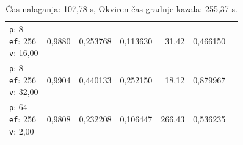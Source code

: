 \begin{table}[htbp]
\begin{tabularx}{\textwidth}{Xrrrrrr}
    \makecell{\texttt{p}: 8\\\texttt{ef}: 256\\\texttt{v}: 16,00} & 0,9880 & 0,253768 & 0,113630 & 31,42 & 0,466150 \\
    \makecell{\texttt{p}: 8\\\texttt{ef}: 256\\\texttt{v}: 32,00} & 0,9904 & 0,440133 & 0,252150 & 18,12 & 0,879967 \\
    \makecell{\texttt{p}: 64\\\texttt{ef}: 256\\\texttt{v}: 2,00} & 0,9808 & 0,232208 & 0,106447 & 266,43 & 0,536235 \\
    \bottomrule
  \end{tabularx}
\caption* {Čas nalaganja: 107,78 s, Okviren čas gradnje kazala: 255,37 s.}\end{table}

